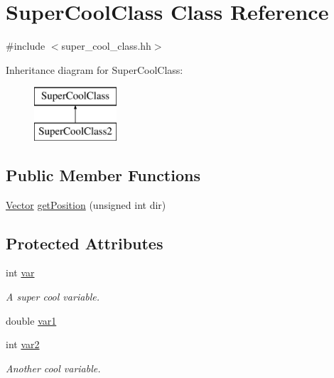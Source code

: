 \hypertarget{class_super_cool_class}{}\section{Super\+Cool\+Class Class Reference}
\label{class_super_cool_class}


{\ttfamily \#include $<$super\+\_\+cool\+\_\+class.\+hh$>$}

Inheritance diagram for Super\+Cool\+Class\+:\begin{figure}[H]
\begin{center}
\leavevmode
\includegraphics[height=2.000000cm]{class_super_cool_class}
\end{center}
\end{figure}
\subsection*{Public Member Functions}
\begin{DoxyCompactItemize}
\item 
\hyperlink{struct_vector}{Vector} \hyperlink{class_super_cool_class_a761c470f000de1a101a855de2d49d195}{get\+Position} (unsigned int dir)
\end{DoxyCompactItemize}
\subsection*{Protected Attributes}
\begin{DoxyCompactItemize}
\item 
int \hyperlink{class_super_cool_class_a0264bf7dc5bfe0057907102b2b5b767d}{var}
\begin{DoxyCompactList}\small\item\em A super cool variable. \end{DoxyCompactList}\item 
double \hyperlink{class_super_cool_class_a0cd88b6d83d78b0f2988647f09b28d89}{var1}
\item 
int \hyperlink{class_super_cool_class_a3aab6b04514bbac39bccd961b2ad470e}{var2}
\begin{DoxyCompactList}\small\item\em Another cool variable. \end{DoxyCompactList}\end{DoxyCompactItemize}


